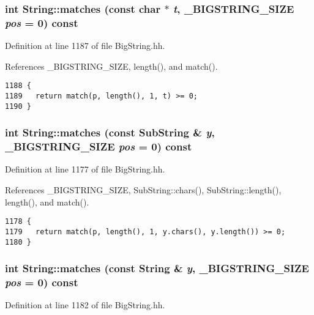 \subsubsection{\setlength{\rightskip}{0pt plus 5cm}int String::matches (const char $\ast$ {\em t}, {\bf \_\-BIGSTRING\_\-SIZE} {\em pos} = 0) const\hspace{0.3cm}{\tt  [inline]}}\label{classString_a45}




Definition at line 1187 of file Big\-String.hh.

References \_\-BIGSTRING\_\-SIZE, length(), and match().



\footnotesize\begin{verbatim}1188 {
1189   return match(p, length(), 1, t) >= 0;
1190 }
\end{verbatim}\normalsize 
{}
\subsubsection{\setlength{\rightskip}{0pt plus 5cm}int String::matches (const {\bf Sub\-String} \& {\em y}, {\bf \_\-BIGSTRING\_\-SIZE} {\em pos} = 0) const\hspace{0.3cm}{\tt  [inline]}}\label{classString_a44}




Definition at line 1177 of file Big\-String.hh.

References \_\-BIGSTRING\_\-SIZE, Sub\-String::chars(), Sub\-String::length(), length(), and match().



\footnotesize\begin{verbatim}1178 {
1179   return match(p, length(), 1, y.chars(), y.length()) >= 0;
1180 }
\end{verbatim}\normalsize 
{}
\subsubsection{\setlength{\rightskip}{0pt plus 5cm}int String::matches (const String \& {\em y}, {\bf \_\-BIGSTRING\_\-SIZE} {\em pos} = 0) const\hspace{0.3cm}{\tt  [inline]}}\label{classString_a43}




Definition at line 1182 of file Big\-String.hh.


